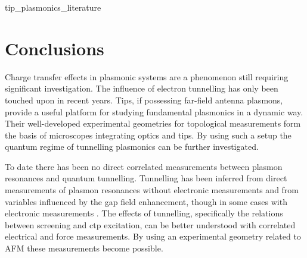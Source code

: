 \documentclass[12pt, a4paper, twoside]{book}
\begin{document}
{tip_plasmonics_literature}

\section{Conclusions}

Charge transfer effects in plasmonic systems are a phenomenon still requiring significant investigation. The influence of electron tunnelling has only been touched upon in recent years. Tips, if possessing far-field antenna plasmons, provide a useful platform for studying fundamental plasmonics in a dynamic way. Their well-developed experimental geometries for topological measurements form the basis of microscopes integrating optics and tips. By using such a setup the quantum regime of tunnelling plasmonics can be further investigated.

To date there has been no direct correlated measurements between plasmon resonances and quantum tunnelling. Tunnelling has been inferred from direct measurements of plasmon resonances without electronic measurements \cite{savage2012, scholl2013} and from variables influenced by the gap field enhancement, though in some cases with electronic measurements \cite{tan2014, zhu2014, hajisalem2014, cha2014}. The effects of tunnelling, specifically the relations between screening and \gls{ctp} excitation, can be better understood with correlated electrical and force measurements. By using an experimental geometry related to AFM these measurements become possible.

\ifstandalone
\begin{singlespace}
\fontsize{8pt}{1em}\selectfont
\printbibliography[notcategory=fullcited]
\end{singlespace}
\fi
\end{document}
